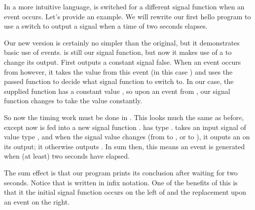 In a more intuitive language,  is switched for a different signal function when an event occurs. Let's provide an example. We will rewrite our first hello program to use a switch to output a  signal when a time of two seconds elapses.



Our new version is certainly no simpler than the original, but it demonstrates basic use of events.  is still our signal function, but now it makes use of a  to change its output. First  outputs a constant signal false. When an event occurs from  however, it takes the value from this event (in this case \hask{()}) and uses the passed function to decide what signal function to switch to. In our case, the supplied function has a constant value , so upon an event from , our signal function changes to take the value  constantly.

So now the timing work must be done in . This looks much the same as before, except now  is fed into a new signal function .  has type .  takes an input signal of value type , and when the signal value changes (from  to , or  to ), it ouputs an  on its output; it otherwise outputs . In sum then, this means an event is generated when (at least) two seconds have elapsed.

The sum effect is that our program prints its conclusion after waiting for two seconds. Notice that  is written in infix notation. One of the benefits of this is that it the initial signal function occurs on the left of  and the replacement upon an event on the right.
